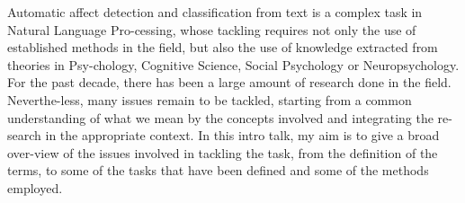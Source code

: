 Automatic affect detection and classification from text is a complex task in Natural Language Pro-cessing, whose tackling requires not only the use of established methods in the field, but also the use of knowledge extracted from theories in Psy-chology, Cognitive Science, Social Psychology or Neuropsychology. For the past decade, there has been a large amount of research done in the field. Neverthe-less, many issues remain to be tackled, starting from a common understanding of what we mean by the concepts involved and integrating the re-search in the appropriate context. In this intro talk, my aim is to give a broad over-view of the issues involved in tackling the task, from the definition of the terms, to some of the tasks that have been defined and some of the methods employed.
